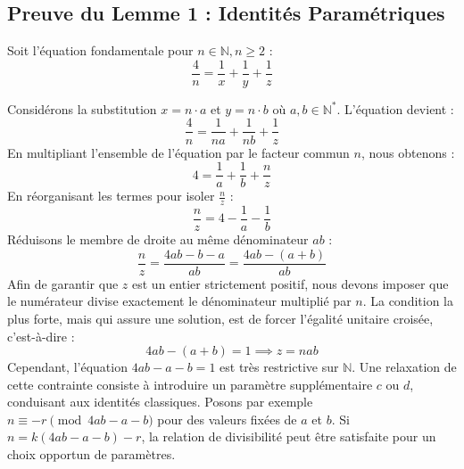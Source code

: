 \documentclass[11pt,a4paper]{article}
\theoremstyle{definition}
\theoremstyle{remark}
\begin{document}
\subsection{Preuve du Lemme 1 : Identit\'es Param\'etriques}

Soit l'\'equation fondamentale pour $n \in \mathbb{N}, n \ge 2$ :
\begin{equation}
\frac{4}{n} = \frac{1}{x} + \frac{1}{y} + \frac{1}{z}
\end{equation}

Consid\'erons la substitution $x = n \cdot a$ et $y = n \cdot b$ o\`u $a,b \in \mathbb{N}^*$. L'\'equation devient :
\begin{equation}
\frac{4}{n} = \frac{1}{na} + \frac{1}{nb} + \frac{1}{z}
\end{equation}
En multipliant l'ensemble de l'\'equation par le facteur commun $n$, nous obtenons :
\begin{equation}
4 = \frac{1}{a} + \frac{1}{b} + \frac{n}{z}
\end{equation}
En r\'eorganisant les termes pour isoler $\frac{n}{z}$ :
\begin{equation}
\frac{n}{z} = 4 - \frac{1}{a} - \frac{1}{b}
\end{equation}
R\'eduisons le membre de droite au m\^eme d\'enominateur $ab$ :
\begin{equation}
\frac{n}{z} = \frac{4ab - b - a}{ab} = \frac{4ab - (a+b)}{ab}
\end{equation}
Afin de garantir que $z$ est un entier strictement positif, nous devons imposer que le num\'erateur divise exactement le d\'enominateur multipli\'e par $n$. La condition la plus forte, mais qui assure une solution, est de forcer l'\'egalit\'e unitaire crois\'ee, c'est-\`a-dire :
\begin{equation}
4ab - (a+b) = 1 \implies z = nab
\end{equation}
Cependant, l'\'equation $4ab - a - b = 1$ est tr\`es restrictive sur $\mathbb{N}$. Une relaxation de cette contrainte consiste \`a introduire un param\`etre suppl\'ementaire $c$ ou $d$, conduisant aux identit\'es classiques. Posons par exemple $n \equiv -r \pmod{4ab - a - b}$ pour des valeurs fix\'ees de $a$ et $b$. Si $n = k(4ab - a - b) - r$, la relation de divisibilit\'e peut \^etre satisfaite pour un choix opportun de param\`etres.
\end{document}
